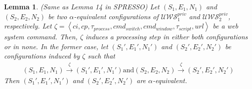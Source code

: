\documentclass[letterpaper,onecolumn,10pt]{article}
\newtheorem{lemma}{Lemma}
\begin{document}
\begin{lemma}
  (Same as Lemma 14 in SPRESSO) Let $(S_1,E_1,N_1)$ and $(S_2,E_2,N_2)$ be two $\alpha$-equivalent configurations of $\mathcal{U\!W\!S}^{priv}_1$ and $\mathcal{U\!W\!S}^{priv}_2$, respectively.
  Let $\zeta\!=\!\left \langle ci,cp,\tau_{process},cmd_{switch},cmd_{window},\tau_{script},url\right \rangle $ be a web system command. Then, $\zeta$ induces a processing step in either both configurations or in none. In the former case, let $(S_1\prime,E_1\prime,N_1\prime)$ and $(S_2\prime,E_2\prime,N_2\prime)$ be configurations induced by $\zeta$ such that
  \begin{equation}
    \begin{aligned}
      (S_1,E_1,N_1)\xrightarrow{\zeta}(S_1\prime,E_1\prime,N_1\prime)\text{and}(S_2,E_2,N_2)\xrightarrow{\zeta}(S_2\prime,E_2\prime,N_2\prime)
    \end{aligned}
  \end{equation}
  Then $(S_1\prime,E_1\prime,N_1\prime)$ and $(S_2\prime,E_2\prime,N_2\prime)$ are $\alpha$-equivalent.
\end{lemma}
\end{document}
